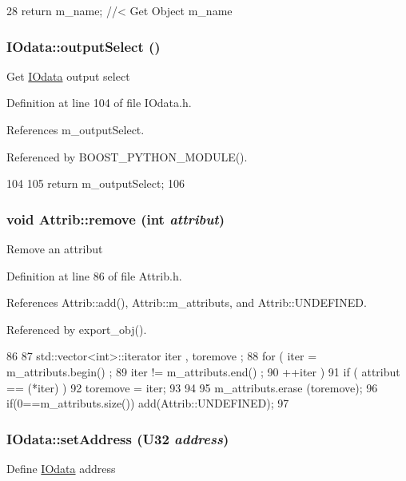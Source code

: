 \begin{DoxyCode}
28 { return m_name; } //< Get Object m_name
\end{DoxyCode}
\hypertarget{classIOdata_aaa410b57a4607857d45ac6a7cd013307}{
\subsubsection[{outputSelect}]{ IOdata::outputSelect ()}}
\label{classIOdata_aaa410b57a4607857d45ac6a7cd013307}
Get \hyperlink{classIOdata}{IOdata} output select 

Definition at line 104 of file IOdata.h.

References m\_\-outputSelect.

Referenced by BOOST\_\-PYTHON\_\-MODULE().


\begin{DoxyCode}
104                     {
105     return m_outputSelect;
106   }
\end{DoxyCode}
\hypertarget{classAttrib_a7d4ef7e32d93cb287792b87b857e79f3}{
\subsubsection[{remove}]{\setlength{\rightskip}{0pt plus 5cm}void Attrib::remove (int {\em attribut})}}
\label{classAttrib_a7d4ef7e32d93cb287792b87b857e79f3}
Remove an attribut 

Definition at line 86 of file Attrib.h.

References Attrib::add(), Attrib::m\_\-attributs, and Attrib::UNDEFINED.

Referenced by export\_\-obj().


\begin{DoxyCode}
86                                {
87     std::vector<int>::iterator iter , toremove ;
88     for ( iter  = m_attributs.begin() ;
89           iter != m_attributs.end()   ;
90           ++iter ) {
91       if ( attribut == (*iter) ) {
92         toremove = iter;
93       }
94     }
95     m_attributs.erase (toremove);
96     if(0==m_attributs.size()) add(Attrib::UNDEFINED);
97   }
\end{DoxyCode}
\hypertarget{classIOdata_af98cbfbc28346ebb9b64ca0203af1463}{
\subsubsection[{setAddress}]{ IOdata::setAddress ({\bf U32} {\em address})}}
\label{classIOdata_af98cbfbc28346ebb9b64ca0203af1463}
Define \hyperlink{classIOdata}{IOdata} address 

